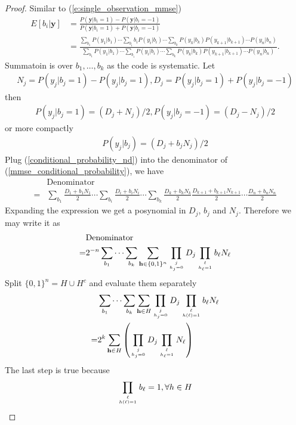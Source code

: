 \documentclass[conference]{IEEEtran}
\newcommand{\vect}[1]{\mathbf{#1}}
\begin{document}
\begin{proof}
Similar to (\ref{e:single_observation_mmse})
\begin{align}
E[b_i|\vect{y}] &= \frac{P(\vect{y}|b_i=1)-P(\vect{y}|b_i=-1)}{P(\vect{y}|b_i=1)+P(\vect{y}|b_i=-1)}\\
&=\frac{\sum_{b_1}P(y_1|b_1)\cdots\sum_{b_i}b_iP(y_i|b_i)\cdots\sum_{b_k}P(y_k|b_k)P(y_{k+1}|b_{k+1})\cdots P(y_n|b_n)}{\sum_{b_1}P(y_1|b_1)\cdots\sum_{b_i}P(y_i|b_i)\cdots\sum_{b_k}P(y_k|b_k)P(y_{k+1}|b_{k+1})\cdots P(y_n|b_n)}. \label{mmse_conditional_probability}
\end{align}
Summatoin is over $b_1, \ldots, b_k$ as the code is systematic. Let
\begin{align}
N_j = P(y_j|b_j=1)-P(y_j|b_j=1), D_j = P(y_j|b_j=1)+P(y_j|b_j=-1)
\end{align}
then
\begin{align}
P(y_j|b_j=1) = (D_j+N_j)/2, P(y_j|b_j=-1) = (D_j-N_j)/2
\end{align}
or more compactly
\begin{align}
P(y_j|b_j) = (D_j+b_jN_j)/2 \label{conditional_probability_nd}
\end{align}
Plug (\ref{conditional_probability_nd}) into the denominator of (\ref{mmse_conditional_probability}), we have
\begin{align}
&\text{Denominator}\\
=&\sum_{b_1}\frac{D_1+b_1N_1}{2}\cdots\sum_{b_i}\frac{D_i+b_iN_i}{2}\cdots\sum_{b_k}\frac{D_k+b_kN_k}{2}\frac{D_{k+1}+b_{k+1}N_{k+1}}{2}\cdots\frac{D_n+b_nN_n}{2}
\end{align}
Expanding the expression we get a posynomial in $D_j$, $b_j$ and $N_j$. Therefore we may write it as
\begin{align}
&\text{Denominator}\\
=&2^{-n}\sum_{b_1}\cdots\sum_{b_k}\sum_{\vect{h}\in \{0,1\}^n}\prod_{j\atop h_j = 0}D_j\prod_{\ell\atop h_\ell = 1}b_\ell N_\ell
\end{align}
Split $\{0,1\}^n=H\cup H^c$ and evaluate them separately
\begin{align}
&\sum_{b_1}\cdots\sum_{b_k}\sum_{\vect{h}\in H}\prod_{j\atop h_j = 0}D_j\prod_{\ell\atop h(\ell) = 1}b_\ell N_\ell\\
=&2^k\sum_{\vect{h}\in H}\left(\prod_{j\atop h_j = 0}D_j\prod_{\ell\atop h_\ell = 1} N_\ell\right)
\end{align}
The last step is true because
\begin{align}
\prod_{\ell\atop h(\ell) = 1}b_\ell =1, \forall h\in H

\end{align}
\end{proof}
\end{document}
